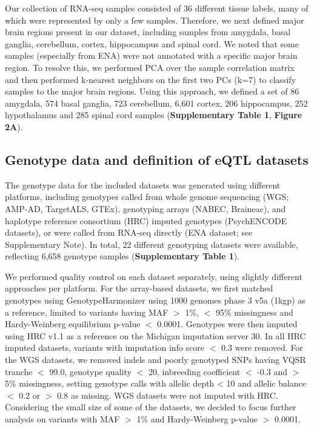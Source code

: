{Our collection of RNA-seq samples consisted of 36 different tissue labels, many of which were represented by only a few samples. Therefore, we next defined major brain regions present in our dataset, including samples from amygdala, basal ganglia, cerebellum, cortex, hippocampus and spinal cord. We noted that some samples (especially from ENA) were not annotated with a specific major brain region. To resolve this, we performed PCA over the sample correlation matrix and then performed k-nearest neighbors on the first two PCs (k=7) to classify samples to the major brain regions. Using this approach, we defined a set of 86 amygdala, 574 basal ganglia, 723 cerebellum, 6,601 cortex, 206 hippocampus, 252 hypothalamus and 285 spinal cord samples (\textbf{Supplementary Table 1}, \textbf{Figure 2A}). 



\subsection{Genotype data and definition of eQTL datasets}
The genotype data for the included datasets was generated using different platforms, including genotypes called from whole genome sequencing (WGS; AMP-AD, TargetALS, GTEx\cite{consortiumGTExConsortiumAtlas2020}), genotyping arrays (NABEC, Braineac\cite{ramasamyGeneticVariabilityRegulation2014}), and haplotype reference consortium (HRC)\cite{mccarthyReferencePanel642016} imputed genotypes (PsychENCODE datasets), or were called from RNA-seq directly (ENA dataset; see Supplementary Note). In total, 22 different genotyping datasets were available, reflecting 6,658 genotype samples (\textbf{Supplementary Table 1}).  

We performed quality control on each dataset separately, using slightly different approaches per platform. For the array-based datasets, we first matched genotypes using GenotypeHarmonizer\cite{deelenGenotypeHarmonizerAutomatic2014} using 1000 genomes phase 3 v5a (1kgp) as a reference, limited to variants having MAF $>$ 1\%, $<$ 95\% missingness and Hardy-Weinberg equilibrium p-value $<$ 0.0001. Genotypes were then imputed using HRC v1.1 as a reference on the Michigan imputation server 30. In all HRC imputed datasets, variants with imputation info score $<$ 0.3 were removed. For the WGS datasets, we removed indels and poorly genotyped SNPs having VQSR tranche $<$ 99.0, genotype quality $<$ 20, inbreeding coefficient $<$ -0.3 and $>$ 5\% missingness, setting genotype calls with allelic depth < 10 and allelic balance $<$ 0.2 or $>$ 0.8 as missing. WGS datasets were not imputed with HRC. Considering the small size of some of the datasets, we decided to focus further analysis on variants with MAF $>$ 1\% and Hardy-Weinberg p-value $>$ 0.0001. 

}
